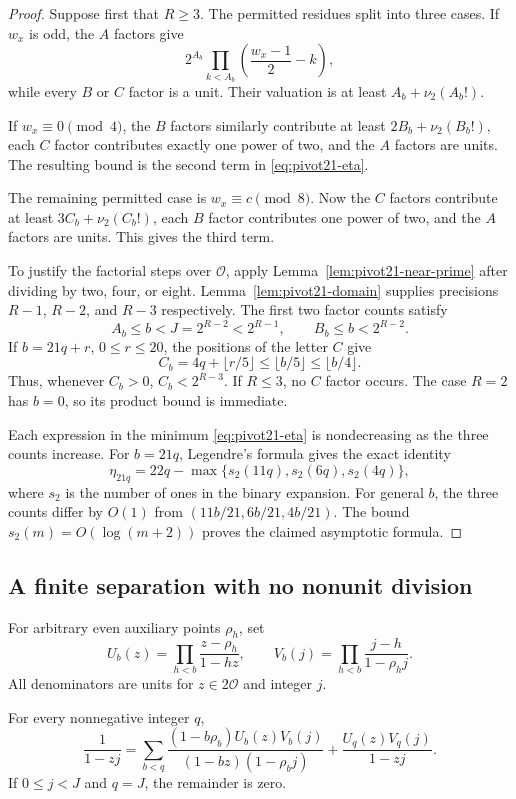 \begin{proof}
Suppose first that $R\ge3$. The permitted residues split into three
cases. If $w_x$ is odd, the $A$ factors give
\[
 2^{A_b}\prod_{k<A_b}\left(\frac{w_x-1}{2}-k\right),
\]
while every $B$ or $C$ factor is a unit. Their valuation is at least
$A_b+\nu_2(A_b!)$.

If $w_x\equiv0\pmod4$, the $B$ factors similarly contribute at
least $2B_b+\nu_2(B_b!)$, each $C$ factor contributes exactly one
power of two, and the $A$ factors are units. The resulting bound is
the second term in \eqref{eq:pivot21-eta}.

The remaining permitted case is $w_x\equiv c\pmod8$. Now the $C$
factors contribute at least $3C_b+\nu_2(C_b!)$, each $B$ factor
contributes one power of two, and the $A$ factors are units. This
gives the third term.

To justify the factorial steps over $\mathcal O$, apply
Lemma~\ref{lem:pivot21-near-prime} after dividing by two, four, or
eight. Lemma~\ref{lem:pivot21-domain} supplies precisions $R-1$,
$R-2$, and $R-3$ respectively. The first two factor counts satisfy
\[
 A_b\le b<J=2^{R-2}<2^{R-1},\qquad
 B_b\le b<2^{R-2}.
\]
If $b=21q+r$, $0\le r\le20$, the positions of the letter $C$ give
\[
 C_b=4q+\lfloor r/5\rfloor\le\lfloor b/5\rfloor
 \le\lfloor b/4\rfloor.
\]
Thus, whenever $C_b>0$, $C_b<2^{R-3}$. If $R\le3$, no $C$ factor
occurs. The case $R=2$ has $b=0$, so its product bound is immediate.

Each expression in the minimum \eqref{eq:pivot21-eta} is
nondecreasing as the three counts increase. For $b=21q$,
Legendre's formula gives the exact identity
\[
 \eta_{21q}=22q-
 \max\{s_2(11q),s_2(6q),s_2(4q)\},
\]
where $s_2$ is the number of ones in the binary expansion.
For general $b$, the three counts differ by $O(1)$ from
$(11b/21,6b/21,4b/21)$. The bound
$s_2(m)=O(\log(m+2))$ proves the claimed asymptotic formula.
\end{proof}

\subsection{A finite separation with no nonunit division}

For arbitrary even auxiliary points $\rho_h$, set
\[
 U_b(z)=\prod_{h<b}\frac{z-\rho_h}{1-hz},\qquad
 V_b(j)=\prod_{h<b}\frac{j-h}{1-\rho_hj}.
\]
All denominators are units for $z\in2\mathcal O$ and integer $j$.

\begin{lemma}
\label{lem:pivot21-finite}
For every nonnegative integer $q$,
\begin{equation}
 \frac1{1-zj}
 =\sum_{b<q}
 \frac{(1-b\rho_b)U_b(z)V_b(j)}{(1-bz)(1-\rho_bj)}
 +\frac{U_q(z)V_q(j)}{1-zj}.
 \label{eq:pivot21-finite}
\end{equation}
If $0\le j<J$ and $q=J$, the remainder is zero.
\end{lemma}

